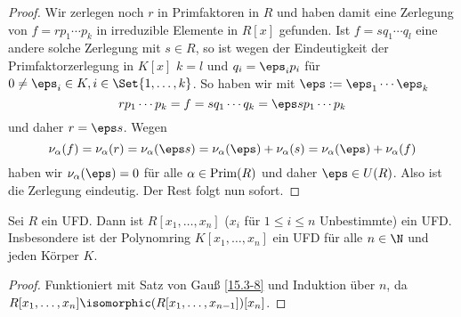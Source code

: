 \begin{st}
\begin{proof}
		Wir zerlegen noch $r$ in Primfaktoren in $R$ und haben damit eine Zerlegung von $f = rp_1\dotsb p_k$ in irreduzible Elemente in $R[x]$ gefunden.
		Ist $f = s q_1 \dotsb q_l$ eine andere solche Zerlegung mit $s \in R$, so ist wegen der Eindeutigkeit der Primfaktorzerlegung in $K[x]$ $k = l$ und $q_i = \eps_i p_i$ für $0 \neq \eps_i \in  K, i \in \Set{1,\dotsc, k}$.
		So haben wir mit $\eps := \eps_1 \dotsb \eps_k$
		\[
			r p_1 \dotsb p_k
			= f
			= s q_1 \dotsb q_k
			= \eps s p_1 \dotsb p_k
		\]
		und daher $r = \eps s$.
		Wegen
		\[
			\nu_\alpha(f)
			= \nu_\alpha(r)
			= \nu_\alpha(\eps s)
			= \nu_\alpha(\eps) + \nu_\alpha(s)
			= \nu_\alpha(\eps) + \nu_\alpha(f)
		\]
		haben wir $\nu_\alpha(\eps) = 0$ für alle $\alpha \in \operatorname{Prim}(R)$ und daher $\eps \in U(R)$.
		Also ist die Zerlegung eindeutig.
		Der Rest folgt nun sofort.
	\end{proof}
\end{st}

\begin{kor} \label{15.3-9}
	Sei $R$ ein UFD.
	Dann ist $R[x_1, \dotsc, x_n]$ ($x_i$ für $1 \le i \le n$ Unbestimmte) ein UFD.
	Insbesondere ist der Polynomring $K[x_1, \dotsc, x_n]$ ein UFD für alle $n \in \N$ und jeden Körper $K$.
	\begin{proof}
		Funktioniert mit Satz von Gauß \ref{15.3-8} und Induktion über $n$, da $R[x_1, \dotsc, x_n] \isomorphic (R[x_1, \dotsc, x_{n-1}])[x_n]$.
	\end{proof}
\end{kor}

